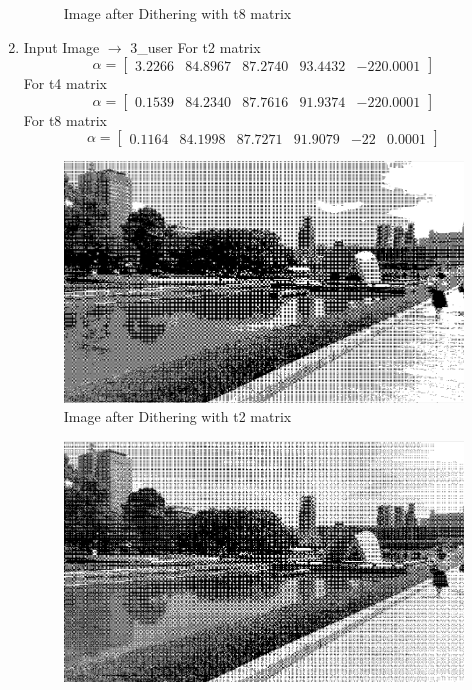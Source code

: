 \documentclass{article}
\begin{document}
\begin{enumerate}
\begin{figure}[H]
        \caption{Image after Dithering with t8 matrix}
        \label{fig:Image after Dithering with t8 matrix}
    \end{figure}
    \item Input Image $\longrightarrow$ 3{\_}user
        \newline
    For t2 matrix
    \[
    \alpha=
    \begin{bmatrix} 
     3.2266 &	84.8967 &	87.2740 &	93.4432 &	-22	0.0001
    \end{bmatrix}
    \]
    For t4 matrix
    \[
    \alpha=
    \begin{bmatrix} 
     0.1539 &	84.2340 &	87.7616 &	91.9374 &	-22	0.0001 
    \end{bmatrix}
    \]
    For t8 matrix
    \[
    \alpha=
    \begin{bmatrix} 
      0.1164 &	84.1998 &	87.7271 &	91.9079 &	-22 &	0.0001  
    \end{bmatrix}
    \]
    \begin{figure}[H]
        \centering
        \includegraphics[width=0.75\linewidth]{341.png}
        \caption{Image after Dithering with t2 matrix}
        \label{fig:Image after Dithering with t2 matrix}
    \end{figure}
    \begin{figure}[H]
        \centering
        \includegraphics[width=0.75\linewidth]{342.png}

\end{figure}
\end{enumerate}
\end{document}
